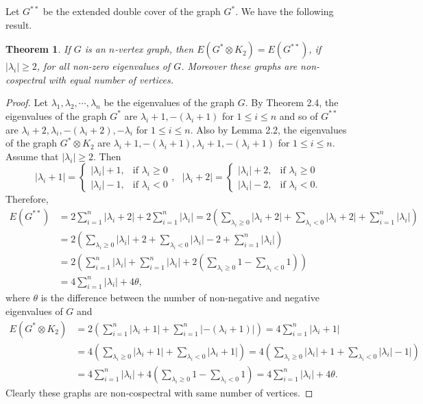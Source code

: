 \documentclass[12pt,a4paper]{amsart}
\newtheorem{theorem}{Theorem}[section]
\theoremstyle{theorem}
\theoremstyle{definition}
\numberwithin{equation}{section} \makeatletter
\begin{document}
\indent Let $G^{**}$ be the extended double cover of the graph $G^*$. We have the following result.
\begin{theorem}
If $G$ is an $n$-vertex graph, then $E(G^*\otimes K_2)=E(G^{**})$, if $|\lambda_i|\geq 2$, for all non-zero eigenvalues of $G$. Moreover these graphs are non-cospectral with equal number of vertices.
\end{theorem}
\begin{proof}
Let $\lambda_1, \lambda_2, \cdots, \lambda_n$ be the eigenvalues of the graph $G$. By Theorem 2.4, the eigenvalues of the graph $G^*$ are $\lambda_i+1, -(\lambda_i+1)$ for $1\leq i\leq n$ and so of $G^{**}$ are $\lambda_i+2, \lambda_i, -(\lambda_i+2), -\lambda_i$ for $ 1\leq i\leq n$. Also by Lemma 2.2, the eigenvalues of the graph $G^*\otimes K_2$ are $\lambda_i+1, -(\lambda_i+1), \lambda_i+1, -(\lambda_i+1)$ for $ 1\leq i\leq n$. Assume that $|\lambda_i|\geq 2$. Then\\
$$|\lambda_i+1|=\left \{\begin{array}{lr}|\lambda_i|+1, &\mbox{if $\lambda_i\geq 0$}\\
|\lambda_i|-1, &\mbox{if $\lambda_i< 0$}
\end{array} \right.,~~~ |\lambda_i+2|=\left \{\begin{array}{lr}|\lambda_i|+2, &\mbox{if $\lambda_i\geq 0$}\\
|\lambda_i|-2, &\mbox{if $\lambda_i< 0.$}
\end{array} \right.$$
Therefore,
\begin{align*}
E(G^{**})&=2\sum\limits_{i=1}^{n}|\lambda_i+2|+2\sum\limits_{i=1}^{n}|\lambda_i|
=2\left (\sum\limits_{\lambda_i\geq 0}|\lambda_i+2|+\sum\limits_{\lambda_i< 0}|\lambda_i+2|+\sum\limits_{i=1}^{n}|\lambda_i| \right)\\&=2\left (\sum\limits_{\lambda_i\geq 0}|\lambda_i|+2+\sum\limits_{\lambda_i< 0}|\lambda_i|-2+\sum\limits_{i=1}^{n}|\lambda_i| \right)\\&=2\left(\sum\limits_{i=1}^{n}|\lambda_i|+\sum\limits_{i=1}^{n}|\lambda_i|+2(\sum\limits_{\lambda_i\geq 0}1-\sum\limits_{\lambda_i< 0}1) \right)\\&=4\sum\limits_{i=1}^{n}|\lambda_i|+4\theta,
\end{align*}
where $\theta$ is the difference between the number of non-negative and negative eigenvalues of $G$ and
\begin{align*}
 E(G^*\otimes K_2)&=2\left (\sum\limits_{i=1}^{n}|\lambda_i+1|+\sum\limits_{i=1}^{n}|-(\lambda_i+1)| \right)=4\sum\limits_{i=1}^{n}|\lambda_i+1|\\&=4\left (\sum\limits_{\lambda_i\geq 0}|\lambda_i+1|+\sum\limits_{\lambda_i< 0}|\lambda_i+1| \right)=4\left (\sum\limits_{\lambda_i\geq 0}|\lambda_i|+1+\sum\limits_{\lambda_i< 0}|\lambda_i|-1| \right)\\&=4\sum\limits_{i=1}^{n}|\lambda_i|+4\left (\sum\limits_{\lambda_i\geq 0}1-\sum\limits_{\lambda_i< 0}1 \right)=4\sum\limits_{i=1}^{n}|\lambda_i|+4\theta.
 \end{align*}
\indent  Clearly these graphs are non-cospectral with same number of vertices.
\end{proof}
\end{document}
